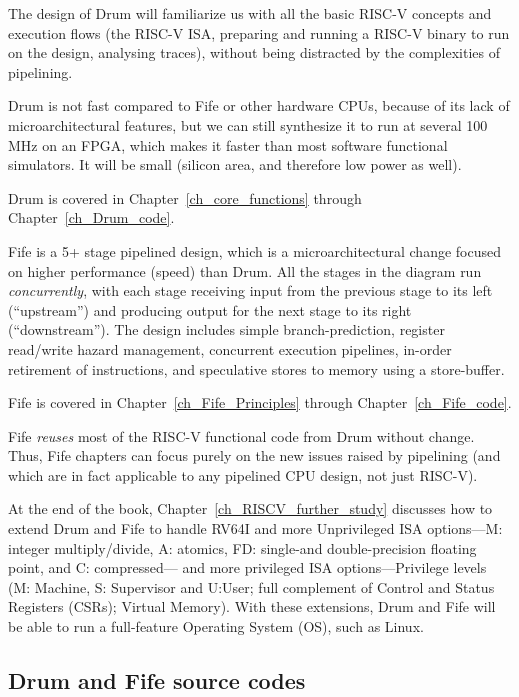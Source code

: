 The design of Drum will familiarize us with all the basic RISC-V
concepts and execution flows (the RISC-V ISA, preparing and running a
RISC-V binary to run on the design, analysing traces), without being
distracted by the complexities of pipelining.

Drum is not fast compared to Fife or other hardware CPUs, because of
its lack of microarchitectural features, but we can still synthesize
it to run at several 100 MHz on an FPGA, which makes it faster than
most software functional simulators.  It will be small (silicon area,
and therefore low power as well).

Drum is covered in Chapter~\ref{ch_core_functions} through
Chapter~\ref{ch_Drum_code}.

Fife is a 5+ stage pipelined design, which is a microarchitectural
change focused on higher performance (speed) than Drum.  All the
stages in the diagram run \emph{concurrently}, with each stage
receiving input from the previous stage to its left (``upstream'') and
producing output for the next stage to its right (``downstream'').
The design includes simple branch-prediction, register read/write
hazard management, concurrent execution pipelines, in-order retirement
of instructions, and speculative stores to memory using a
store-buffer.

Fife is covered in Chapter~\ref{ch_Fife_Principles} through
Chapter~\ref{ch_Fife_code}.

Fife \emph{reuses} most of the RISC-V functional code from Drum
without change.  Thus, Fife chapters can focus purely on the new
issues raised by pipelining (and which are in fact applicable to any
pipelined CPU design, not just RISC-V).

At the end of the book, Chapter~\ref{ch_RISCV_further_study} discusses
how to extend Drum and Fife to handle RV64I and more Unprivileged ISA
options---M: integer multiply/divide, A: atomics, FD: single-and
double-precision floating point, and C: compressed--- and more
privileged ISA options---Privilege levels (M: Machine, S: Supervisor
and U:User; full complement of Control and Status Registers (CSRs);
Virtual Memory).  With these extensions, Drum and Fife will be able to
run a full-feature Operating System (OS), such as Linux.


\subsection{Drum and Fife source codes}

